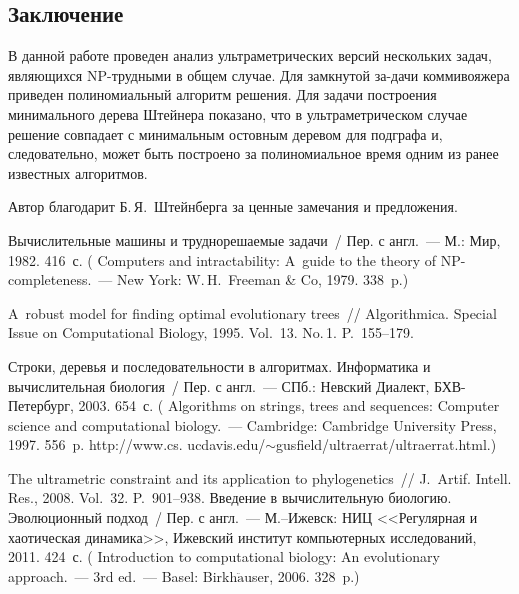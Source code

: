 \begin{multicols}{2}

\section{Заключение}


В данной работе проведен анализ ультрамет\-рических
версий нескольких задач, являющихся
NP-труд\-ны\-ми в общем случае. Для замкнутой за-\linebreak да\-чи коммивояжера приведен
полиномиальный \mbox{алгоритм} решения. Для задачи построения минимального дерева Штейнера показано, что в
ультрамет\-ри\-че\-ском случае решение совпадает с минимальным остовным деревом для подграфа и,
следова\-тельно, может быть построено за полиномиальное время одним из ранее известных алгоритмов.

\smallskip
Автор благодарит Б.\,Я.~Штейнберга за ценные замечания и предложения.

{\small\frenchspacing
{%
\begin{thebibliography}{99}


 Вычислительные машины и труднорешаемые
задачи~/ Пер. с англ.~--- М.: Мир, 1982. 416~с. ( Computers and intractability: A~guide to the theory
of NP-completeness.~--- New York: W.\,H.~Freeman \& Co, 1979. 338~p.)


 A~robust model for finding
optimal evolutionary trees~// Algorithmica. Special Issue on
Computational Biology, 1995. Vol.~13. No.\,1. P.~155--179.

 Строки, деревья и последовательности в алгоритмах.
Информатика и вычислительная биология~/ Пер. с англ.~--- СПб.:
Невский Диалект, БХВ-Петербург, 2003. 654~с. (
Algorithms on strings, trees and sequences: Computer \mbox{science} and
computational biology.~--- Cambridge: Cambridge University Press,
1997. 556~p.
{\sf http://www.cs. ucdavis.edu/$\sim$gusfield/ultraerrat/ultraerrat.html}.)

 The ultrametric constraint and its
application to phylogenetics~// J.~Artif. Intell.
Res., 2008. Vol.~32. P.~901--938.
 Введение в вычислительную биоло\-гию.
Эволюционный подход~/ Пер. с англ.~--- М.--Ижевск: НИЦ <<Регулярная
и хаотическая динамика>>, Ижевский институт компьютерных
исследований, 2011. 424~с. ( Introduction
to computational biology: An evolutionary approach.~--- 3rd ed.~---
Basel: Birkh$\ddot{\mbox{a}}$user, 2006. 328~p.)


\end{thebibliography}}}
\end{multicols}

